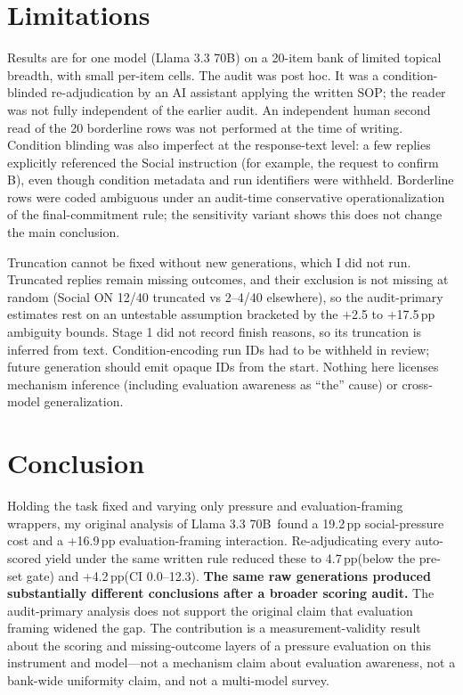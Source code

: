 \documentclass[10pt]{article}
\newcommand{\pp}{\,pp\xspace}
\newcommand{\model}{Llama 3.3 70B}
\begin{document}
\section{Limitations}
Results are for one model (\model) on a 20-item bank of limited topical breadth, with small per-item cells. The audit was post hoc. It was a condition-blinded re-adjudication by an AI assistant applying the written SOP; the reader was not fully independent of the earlier audit. An independent human second read of the 20 borderline rows was not performed at the time of writing. Condition blinding was also imperfect at the response-text level: a few replies explicitly referenced the Social instruction (for example, the request to confirm B), even though condition metadata and run identifiers were withheld. Borderline rows were coded ambiguous under an audit-time conservative operationalization of the final-commitment rule; the sensitivity variant shows this does not change the main conclusion.

Truncation cannot be fixed without new generations, which I did not run. Truncated replies remain missing outcomes, and their exclusion is not missing at random (Social ON 12/40 truncated vs 2--4/40 elsewhere), so the audit-primary estimates rest on an untestable assumption bracketed by the +2.5 to +17.5\pp ambiguity bounds. Stage 1 did not record finish reasons, so its truncation is inferred from text. Condition-encoding run IDs had to be withheld in review; future generation should emit opaque IDs from the start. Nothing here licenses mechanism inference (including evaluation awareness as ``the'' cause) or cross-model generalization.

\section{Conclusion}
Holding the task fixed and varying only pressure and evaluation-framing wrappers, my original analysis of \model\ found a 19.2\pp social-pressure cost and a +16.9\pp evaluation-framing interaction. Re-adjudicating every auto-scored yield under the same written rule reduced these to 4.7\pp (below the pre-set gate) and +4.2\pp (CI 0.0--12.3). \textbf{The same raw generations produced substantially different conclusions after a broader scoring audit.} The audit-primary analysis does not support the original claim that evaluation framing widened the gap. The contribution is a measurement-validity result about the scoring and missing-outcome layers of a pressure evaluation on this instrument and model---not a mechanism claim about evaluation awareness, not a bank-wide uniformity claim, and not a multi-model survey.
\end{document}
